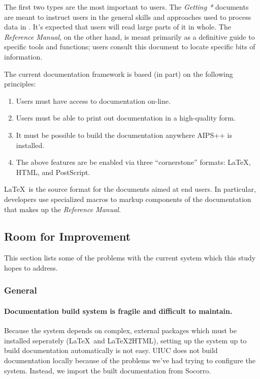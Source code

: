 \noindent The first two types are the most important to users.  The
{\it Getting *} documents are meant to instruct users
in the general skills and approaches used to process data in
\aipspp.  It's expected that users will read large parts of it in
whole.  The {\it Reference Manual}, on the other hand, is meant
primarily as a definitive guide to specific tools and functions; users
consult this document to locate specific bits of information.  

The current documentation framework is based (in part) on the
following principles:

\begin{enumerate}
\item Users must have access to documentation on-line.
\item Users must be able to print out documentation in a high-quality
form.
\item It must be possible to build the documentation anywhere AIPS++
is installed.
\item The above features are be enabled via three ``cornerstone''
formats: \LaTeX, HTML, and PostScript.  
\end{enumerate}

\noindent \LaTeX\ is the source format for the documents aimed at
end users.  In particular, developers use specialized macros to
markup components of the documentation that makes up the {\it
Reference Manual}.  

\subsection{Room for Improvement}

This section lists some of the problems with the current system which
this study hopes to address.

\subsubsection{General}

\paragraph{Documentation build system is fragile and difficult to
maintain.}  Because the system depends on complex, external packages
which must be installed seperately (\LaTeX\ and \LaTeX2HTML), setting
up the system up to build documentation automatically is not easy.
UIUC does not build documentation locally because of the problems
we've had trying to configure the system.  Instead, we import the
built documentation from Socorro.  

